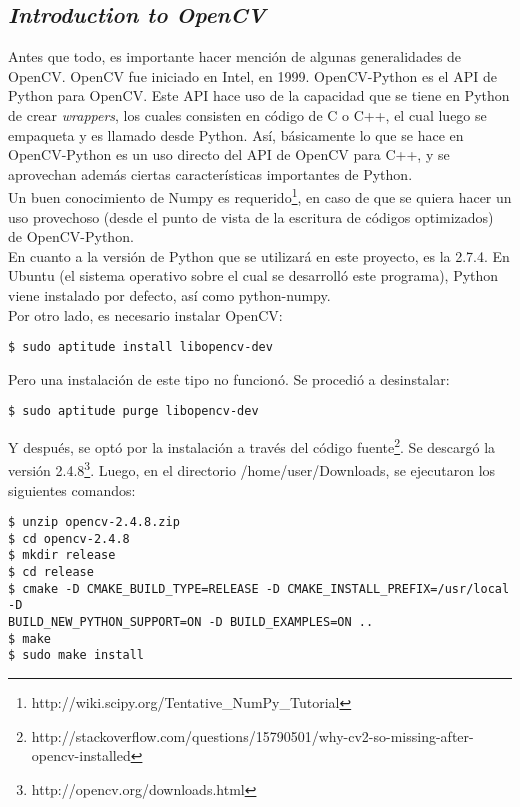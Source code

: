 \documentclass[letter]{article}
\begin{document}
\subsection{\normalsize \textit{Introduction to OpenCV}}
Antes que todo, es importante hacer mención de algunas generalidades de OpenCV. OpenCV fue iniciado en Intel, en 1999. OpenCV-Python es el API de Python para OpenCV. Este API hace uso de la capacidad que se tiene en Python de crear \textit{wrappers}, los cuales consisten en código de C o C++, el cual luego se empaqueta y es llamado desde Python. Así, básicamente lo que se hace en OpenCV-Python es un uso directo del API de OpenCV para C++, y se aprovechan además ciertas características importantes de Python.\\
Un buen conocimiento de Numpy es requerido\footnote{http://wiki.scipy.org/Tentative\_NumPy\_Tutorial}, en caso de que se quiera hacer un uso provechoso (desde el punto de vista de la escritura de códigos optimizados) de OpenCV-Python.\\
En cuanto a la versión de Python que se utilizará en este proyecto, es la 2.7.4. En Ubuntu (el sistema operativo sobre el cual se desarrolló este programa), Python viene instalado por defecto, así como python-numpy.\\
Por otro lado, es necesario instalar OpenCV:
\lstset{language=bash}
\begin{lstlisting}
$ sudo aptitude install libopencv-dev
\end{lstlisting}

Pero una instalación de este tipo no funcionó. Se procedió a desinstalar:

\begin{lstlisting}
$ sudo aptitude purge libopencv-dev
\end{lstlisting}

Y después, se optó por la instalación a través del código fuente\footnote{http://stackoverflow.com/questions/15790501/why-cv2-so-missing-after-opencv-installed}. Se descargó la versión 2.4.8\footnote{http://opencv.org/downloads.html}. Luego, en el directorio /home/user/Downloads, se ejecutaron los siguientes comandos:

\begin{lstlisting}
$ unzip opencv-2.4.8.zip
$ cd opencv-2.4.8
$ mkdir release
$ cd release
$ cmake -D CMAKE_BUILD_TYPE=RELEASE -D CMAKE_INSTALL_PREFIX=/usr/local -D
BUILD_NEW_PYTHON_SUPPORT=ON -D BUILD_EXAMPLES=ON ..
$ make
$ sudo make install
\end{lstlisting}
\end{document}

